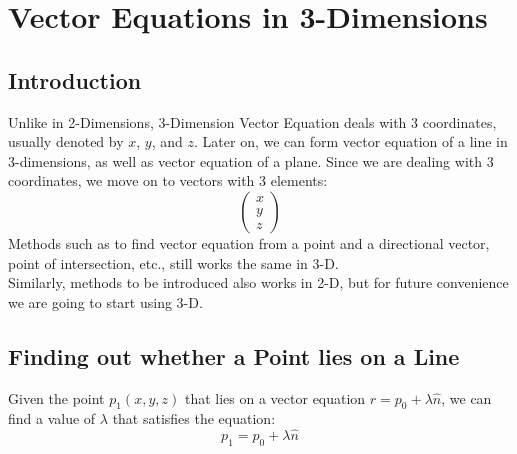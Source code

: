 \documentclass[hidelinks, a4paper, 12pt]{article}
\newcommand{\nhat}{\hat{n}}
\newcommand{\n}{\\[\baselineskip]}
\begin{document}
    \section{Vector Equations in 3-Dimensions}
        \subsection{Introduction}
            Unlike in 2-Dimensions, 3-Dimension Vector Equation deals with 3 coordinates, usually denoted by $x$, $y$, and $z$.
            Later on, we can form vector equation of a line in 3-dimensions, as well as vector equation of a plane. Since we are dealing with 3 coordinates, 
            we move on to vectors with 3 elements:
            \[\begin{pmatrix} x \\ y \\ z \end{pmatrix}\]
            Methods such as to find vector equation from a point and a directional vector, point of intersection, etc., still works the same in 3-D.\n
            Similarly, methods to be introduced also works in 2-D, but for future convenience we are going to start using 3-D.
        
        \subsection{Finding out whether a Point lies on a Line}
            Given the point $p_1(x, y, z)$ that lies on a vector equation $r = p_0 + \lambda \nhat$, we can find a value of $\lambda$ that satisfies the equation:
            \[p_1 = p_0 + \lambda \nhat\]
\end{document}
